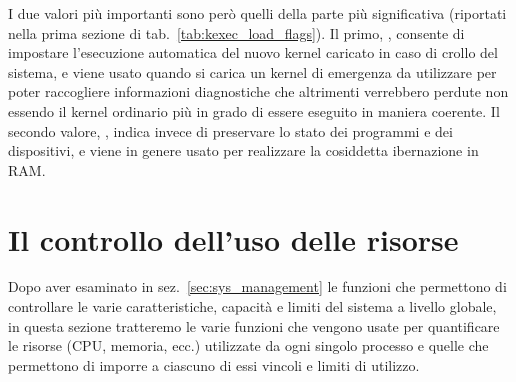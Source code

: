I due valori più importanti sono però quelli della parte più significativa
(riportati nella prima sezione di tab.~\ref{tab:kexec_load_flags}). Il primo,
, consente di impostare l'esecuzione automatica del
nuovo kernel caricato in caso di crollo del sistema, e viene usato quando si
carica un kernel di emergenza da utilizzare per poter raccogliere informazioni
diagnostiche che altrimenti verrebbero perdute non essendo il kernel ordinario
più in grado di essere eseguito in maniera coerente.  Il secondo valore,
, indica invece di preservare lo stato dei
programmi e dei dispositivi, e viene in genere usato per realizzare la
cosiddetta ibernazione in RAM.







\section{Il controllo dell'uso delle risorse}
\label{sec:sys_res_limits}


Dopo aver esaminato in sez.~\ref{sec:sys_management} le funzioni che
permettono di controllare le varie caratteristiche, capacità e limiti del
sistema a livello globale, in questa sezione tratteremo le varie funzioni che
vengono usate per quantificare le risorse (CPU, memoria, ecc.) utilizzate da
ogni singolo processo e quelle che permettono di imporre a ciascuno di essi
vincoli e limiti di utilizzo.


